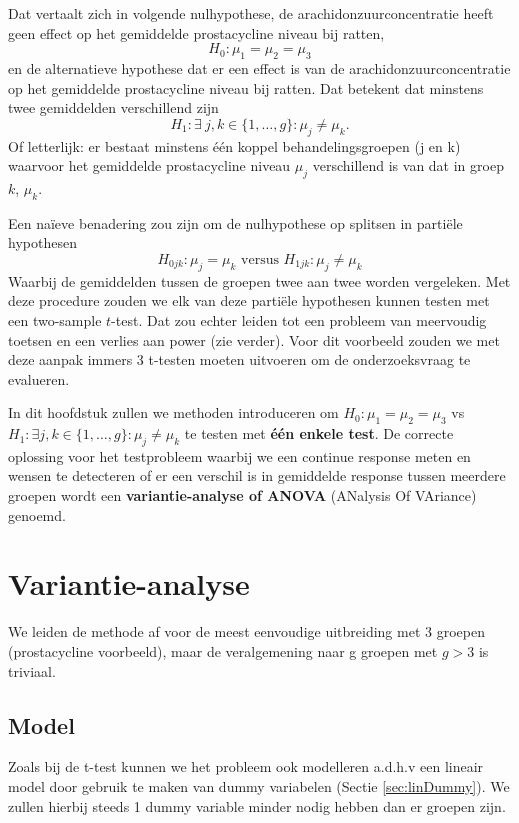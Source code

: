 \documentclass[12pt,dutch,coursenotes]{book}
\theoremstyle{definition}
\theoremstyle{definition}
\theoremstyle{definition}
\theoremstyle{remark}
\begin{document}
Dat vertaalt zich in volgende nulhypothese, de arachidonzuurconcentratie
heeft geen effect op het gemiddelde prostacycline niveau bij ratten,
\[H_0:\mu_1=\mu_2 = \mu_3\] en de alternatieve hypothese dat er een
effect is van de arachidonzuurconcentratie op het gemiddelde
prostacycline niveau bij ratten. Dat betekent dat minstens twee
gemiddelden verschillend zijn
\[H_1: \exists\ j,k \in \{1,\ldots,g\} : \mu_j\neq\mu_k.\] Of
letterlijk: er bestaat minstens één koppel behandelingsgroepen (j en k)
waarvoor het gemiddelde prostacycline niveau \(\mu_j\) verschillend is
van dat in groep \(k\), \(\mu_k\).

Een naïeve benadering zou zijn om de nulhypothese op splitsen in
partiële hypothesen
\[  H_{0jk}: \mu_j=\mu_k \text{ versus } H_{1jk}: \mu_j \neq \mu_k\]
Waarbij de gemiddelden tussen de groepen twee aan twee worden
vergeleken. Met deze procedure zouden we elk van deze partiële
hypothesen kunnen testen met een two-sample \(t\)-test. Dat zou echter
leiden tot een probleem van meervoudig toetsen en een verlies aan power
(zie verder). Voor dit voorbeeld zouden we met deze aanpak immers 3
t-testen moeten uitvoeren om de onderzoeksvraag te evalueren.

In dit hoofdstuk zullen we methoden introduceren om
\(H_0:\mu_1=\mu_2=\mu_3\) vs
\(H_1: \exists j,k \in \{1,\ldots,g\} : \mu_j\neq\mu_k\) te testen met
\textbf{één enkele test}. De correcte oplossing voor het testprobleem
waarbij we een continue response meten en wensen te detecteren of er een
verschil is in gemiddelde response tussen meerdere groepen wordt een
\textbf{variantie-analyse of ANOVA} (ANalysis Of VAriance) genoemd.

\section{Variantie-analyse}\label{variantie-analyse}

We leiden de methode af voor de meest eenvoudige uitbreiding met 3
groepen (prostacycline voorbeeld), maar de veralgemening naar g groepen
met \(g>3\) is triviaal.

\subsection{Model}\label{model-2}

Zoals bij de t-test kunnen we het probleem ook modelleren a.d.h.v een
lineair model door gebruik te maken van dummy variabelen (Sectie
\ref{sec:linDummy}). We zullen hierbij steeds 1 dummy variable minder
nodig hebben dan er groepen zijn.
\end{document}
